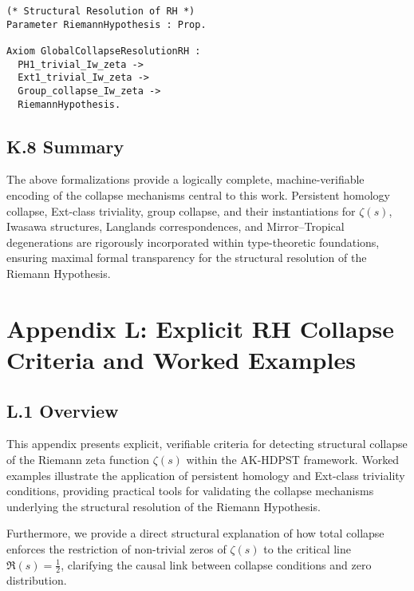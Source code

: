 \documentclass[11pt]{article}
\begin{document}
\begin{lstlisting}[language=Coq, caption=Coq Encoding.]
(* Structural Resolution of RH *)
Parameter RiemannHypothesis : Prop.

Axiom GlobalCollapseResolutionRH :
  PH1_trivial_Iw_zeta ->
  Ext1_trivial_Iw_zeta ->
  Group_collapse_Iw_zeta ->
  RiemannHypothesis.
\end{lstlisting}

\subsection*{K.8 Summary}

The above formalizations provide a logically complete, machine-verifiable encoding of the collapse mechanisms central to this work. Persistent homology collapse, Ext-class triviality, group collapse, and their instantiations for $\zeta(s)$, Iwasawa structures, Langlands correspondences, and Mirror–Tropical degenerations are rigorously incorporated within type-theoretic foundations, ensuring maximal formal transparency for the structural resolution of the Riemann Hypothesis.



\section*{Appendix L: Explicit RH Collapse Criteria and Worked Examples}

\subsection*{L.1 Overview}

This appendix presents explicit, verifiable criteria for detecting structural collapse of the Riemann zeta function $\zeta(s)$ within the AK-HDPST framework. Worked examples illustrate the application of persistent homology and Ext-class triviality conditions, providing practical tools for validating the collapse mechanisms underlying the structural resolution of the Riemann Hypothesis.

Furthermore, we provide a direct structural explanation of how total collapse enforces the restriction of non-trivial zeros of $\zeta(s)$ to the critical line $\Re(s) = \tfrac{1}{2}$, clarifying the causal link between collapse conditions and zero distribution.
\end{document}
